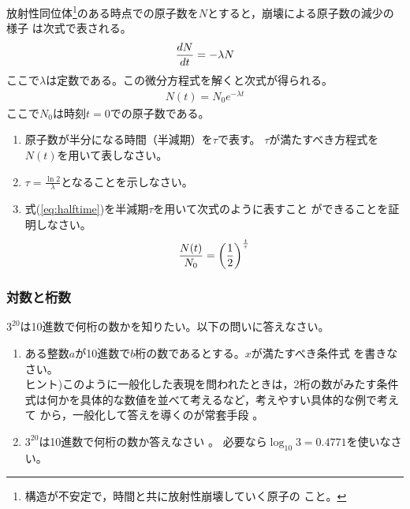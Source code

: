 \documentclass[twocolumn,11pt]{jarticle}
\begin{document}
\nquestion
放射性同位体\footnote{構造が不安定で，時間と共に放射性崩壊していく原子の
  こと。}のある時点での原子数を$N$とすると，崩壊による原子数の減少の様子
は次式で表される。
\begin{align}
  \frac{dN}{dt}=-\lambda N\notag
\end{align}
ここで$\lambda$は定数である。この微分方程式を解くと次式が得られる。
\begin{align}
  \label{eq:halftime}
  N(t)=N_0e^{-\lambda t}
\end{align}
ここで$N_0$は時刻$t=0$での原子数である。

\begin{enumerate}
\item 
 原子数が半分になる時間（半減期）を$\tau$で表す。
 $\tau$が満たすべき方程式を$N(t)$を用いて表しなさい。
\item 
  $\tau=\displaystyle\frac{\ln 2}{\lambda}$となることを示しなさい。
\item 
 式(\ref{eq:halftime})を半減期$\tau$を用いて次式のように表すこと
  ができることを証明しなさい。
  \begin{align}
    \frac{N(t)}{N_0}=\left(\frac{1}{2}\right)^{\frac{t}{\tau}}\notag
  \end{align}
\end{enumerate}


\subsubsection{対数と桁数}
\nquestion 
$3^{20}$は10進数で何桁の数かを知りたい。以下の問いに答えなさい。
\begin{enumerate}
\item ある整数$a$が10進数で$b$桁の数であるとする。$x$が満たすべき条件式
  を書きなさい。\\
ヒント)このように一般化した表現を問われたときは，2桁の数がみたす条件
式は何かを具体的な数値を並べて考えるなど，考えやすい具体的な例で考えて
から，一般化して答えを導くのが常套手段
  。
\item $3^{20}$は10進数で何桁の数か答えなさい
。
必要なら$\log_{10}3=0.4771$を使いなさい。
\end{enumerate}

\end{document}
